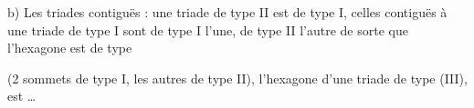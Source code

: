 \documentclass[11pt,a4paper]{article}
\begin{document}
b) Les triades contiguës : une triade
de type II est de type I, celles
contiguës à une triade de type I sont
de type I l'une, de type II l'autre 
de sorte que \struck{\ill{}} l'hexagone \struck{\ill{}}  est
de type


(2 sommets  de
type I, les autres de type II), l'hexagone
 d'une triade de type (III), est …
\end{document}
